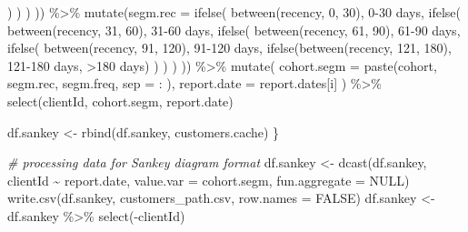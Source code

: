 \documentclass[
]{book}
\newenvironment{Shaded}{\begin{snugshade}}{\end{snugshade}}
\newcommand{\AttributeTok}[1]{\textcolor[rgb]{0.77,0.63,0.00}{#1}}
\newcommand{\CommentTok}[1]{\textcolor[rgb]{0.56,0.35,0.01}{\textit{#1}}}
\newcommand{\ConstantTok}[1]{\textcolor[rgb]{0.00,0.00,0.00}{#1}}
\newcommand{\DecValTok}[1]{\textcolor[rgb]{0.00,0.00,0.81}{#1}}
\newcommand{\FunctionTok}[1]{\textcolor[rgb]{0.00,0.00,0.00}{#1}}
\newcommand{\NormalTok}[1]{#1}
\newcommand{\OtherTok}[1]{\textcolor[rgb]{0.56,0.35,0.01}{#1}}
\newcommand{\SpecialCharTok}[1]{\textcolor[rgb]{0.00,0.00,0.00}{#1}}
\newcommand{\StringTok}[1]{\textcolor[rgb]{0.31,0.60,0.02}{#1}}
\begin{document}
\begin{Shaded}
\begin{Highlighting}[]
\NormalTok{                    )}
\NormalTok{                )}
\NormalTok{            )}
\NormalTok{        )) }\SpecialCharTok{\%\textgreater{}\%}
        \FunctionTok{mutate}\NormalTok{(}\AttributeTok{segm.rec =} \FunctionTok{ifelse}\NormalTok{(}
            \FunctionTok{between}\NormalTok{(recency, }\DecValTok{0}\NormalTok{, }\DecValTok{30}\NormalTok{),}
            \StringTok{\textquotesingle{}0{-}30 days\textquotesingle{}}\NormalTok{,}
            \FunctionTok{ifelse}\NormalTok{(}
                \FunctionTok{between}\NormalTok{(recency, }\DecValTok{31}\NormalTok{, }\DecValTok{60}\NormalTok{),}
                \StringTok{\textquotesingle{}31{-}60 days\textquotesingle{}}\NormalTok{,}
                \FunctionTok{ifelse}\NormalTok{(}
                    \FunctionTok{between}\NormalTok{(recency, }\DecValTok{61}\NormalTok{, }\DecValTok{90}\NormalTok{),}
                    \StringTok{\textquotesingle{}61{-}90 days\textquotesingle{}}\NormalTok{,}
                    \FunctionTok{ifelse}\NormalTok{(}
                        \FunctionTok{between}\NormalTok{(recency, }\DecValTok{91}\NormalTok{, }\DecValTok{120}\NormalTok{),}
                        \StringTok{\textquotesingle{}91{-}120 days\textquotesingle{}}\NormalTok{,}
                        \FunctionTok{ifelse}\NormalTok{(}\FunctionTok{between}\NormalTok{(recency, }\DecValTok{121}\NormalTok{, }\DecValTok{180}\NormalTok{), }\StringTok{\textquotesingle{}121{-}180 days\textquotesingle{}}\NormalTok{, }\StringTok{\textquotesingle{}\textgreater{}180 days\textquotesingle{}}\NormalTok{)}
\NormalTok{                    )}
\NormalTok{                )}
\NormalTok{            )}
\NormalTok{        )) }\SpecialCharTok{\%\textgreater{}\%}
        \FunctionTok{mutate}\NormalTok{(}
            \AttributeTok{cohort.segm =} \FunctionTok{paste}\NormalTok{(cohort, segm.rec, segm.freq, }\AttributeTok{sep =} \StringTok{\textquotesingle{} : \textquotesingle{}}\NormalTok{),}
            \AttributeTok{report.date =}\NormalTok{ report.dates[i]}
\NormalTok{        ) }\SpecialCharTok{\%\textgreater{}\%}
        \FunctionTok{select}\NormalTok{(clientId, cohort.segm, report.date)}
    
\NormalTok{    df.sankey }\OtherTok{\textless{}{-}} \FunctionTok{rbind}\NormalTok{(df.sankey, customers.cache)}
\NormalTok{\}}

\CommentTok{\# processing data for Sankey diagram format}
\NormalTok{df.sankey }\OtherTok{\textless{}{-}}
    \FunctionTok{dcast}\NormalTok{(df.sankey,}
\NormalTok{          clientId }\SpecialCharTok{\textasciitilde{}}\NormalTok{ report.date,}
          \AttributeTok{value.var =} \StringTok{\textquotesingle{}cohort.segm\textquotesingle{}}\NormalTok{,}
          \AttributeTok{fun.aggregate =} \ConstantTok{NULL}\NormalTok{)}
\FunctionTok{write.csv}\NormalTok{(df.sankey, }\StringTok{\textquotesingle{}customers\_path.csv\textquotesingle{}}\NormalTok{, }\AttributeTok{row.names =} \ConstantTok{FALSE}\NormalTok{)}
\NormalTok{df.sankey }\OtherTok{\textless{}{-}}\NormalTok{ df.sankey }\SpecialCharTok{\%\textgreater{}\%} \FunctionTok{select}\NormalTok{(}\SpecialCharTok{{-}}\NormalTok{clientId)}


\end{Highlighting}
\end{Shaded}
\end{document}
